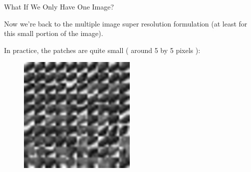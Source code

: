 \documentclass{beamer}
\begin{document}

\begin{frame}{What If We Only Have One Image?}

Now we're back to the multiple image super resolution formulation (at least for this small portion of the image).

\vspace{0.3cm}

In practice, the patches are quite small ( around 5 by 5 pixels ):

\begin{figure}
\centering
\includegraphics[width=0.5\textwidth]{similar_patches_1.png}
\end{figure}

\end{frame}

\end{document}
